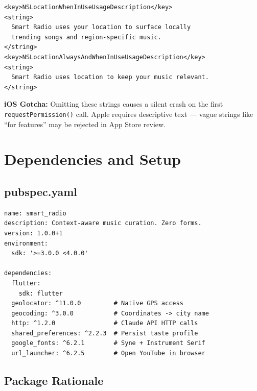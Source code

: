 \documentclass[12pt, a4paper]{report}
\begin{document}
\begin{tcolorbox}[cyanbox, title=Info.plist (add before closing dict)]
\begin{lstlisting}[style=yamlcode, numbers=none]
<key>NSLocationWhenInUseUsageDescription</key>
<string>
  Smart Radio uses your location to surface locally
  trending songs and region-specific music.
</string>
<key>NSLocationAlwaysAndWhenInUseUsageDescription</key>
<string>
  Smart Radio uses location to keep your music relevant.
</string>
\end{lstlisting}
\end{tcolorbox}

\begin{tcolorbox}[notebox]
\textbf{\color{solarcolor}iOS Gotcha:} Omitting these strings causes a silent
crash on the first \texttt{requestPermission()} call. Apple requires descriptive
text --- vague strings like ``for features'' may be rejected in App Store review.
\end{tcolorbox}

\chapter{Dependencies and Setup}

\section{pubspec.yaml}

\begin{tcolorbox}[cyanbox, title=pubspec.yaml]
\begin{lstlisting}[style=yamlcode, numbers=none]
name: smart_radio
description: Context-aware music curation. Zero forms.
version: 1.0.0+1
environment:
  sdk: '>=3.0.0 <4.0.0'

dependencies:
  flutter:
    sdk: flutter
  geolocator: ^11.0.0         # Native GPS access
  geocoding: ^3.0.0           # Coordinates -> city name
  http: ^1.2.0                # Claude API HTTP calls
  shared_preferences: ^2.2.3  # Persist taste profile
  google_fonts: ^6.2.1        # Syne + Instrument Serif
  url_launcher: ^6.2.5        # Open YouTube in browser
\end{lstlisting}
\end{tcolorbox}

\section{Package Rationale}
\end{document}
